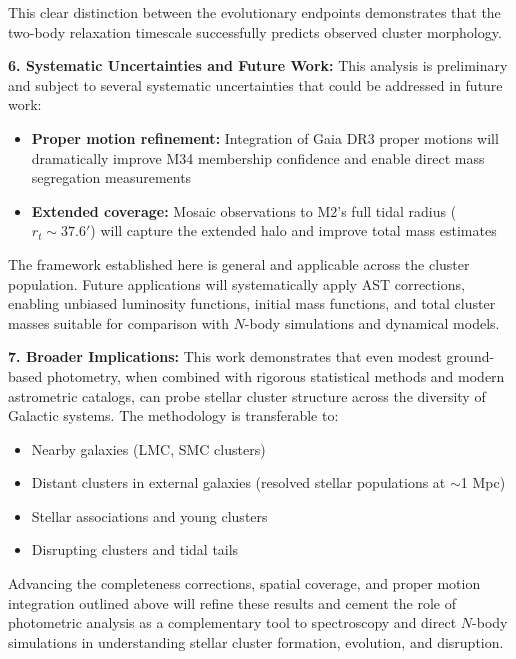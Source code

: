\documentclass[linenumbers,trackchanges,twocolumn]{aastex701}
\begin{document}
This clear distinction between the evolutionary endpoints demonstrates that the two-body relaxation timescale successfully predicts observed cluster morphology.

\textbf{6. Systematic Uncertainties and Future Work:} This analysis is preliminary and subject to several systematic uncertainties that could be addressed in future work:
\begin{itemize}
\item \textbf{Proper motion refinement:} Integration of Gaia DR3 proper motions will dramatically improve M34 membership confidence and enable direct mass segregation measurements
\item \textbf{Extended coverage:} Mosaic observations to M2's full tidal radius ($r_t \sim 37.6'$) will capture the extended halo and improve total mass estimates
\end{itemize}

The framework established here is general and applicable across the cluster population. Future applications will systematically apply AST corrections, enabling unbiased luminosity functions, initial mass functions, and total cluster masses suitable for comparison with $N$-body simulations and dynamical models.

\textbf{7. Broader Implications:} This work demonstrates that even modest ground-based photometry, when combined with rigorous statistical methods and modern astrometric catalogs, can probe stellar cluster structure across the diversity of Galactic systems. The methodology is transferable to:
\begin{itemize}
\item Nearby galaxies (LMC, SMC clusters)
\item Distant clusters in external galaxies (resolved stellar populations at $\sim$1 Mpc)
\item Stellar associations and young clusters
\item Disrupting clusters and tidal tails
\end{itemize}

Advancing the completeness corrections, spatial coverage, and proper motion integration outlined above will refine these results and cement the role of photometric analysis as a complementary tool to spectroscopy and direct $N$-body simulations in understanding stellar cluster formation, evolution, and disruption. 
\end{document}
